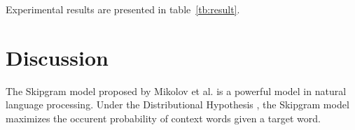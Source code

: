 \documentclass[letterpaper]{article}
\begin{document}
            Experimental results are presented in table~\ref{tb:result}.

            \begin{table}
                \centering
                \label{tb:result}
                \caption{Multilabel classification weighted f1-macro}
            \end{table}

    \section{Discussion}

            The Skipgram model proposed by Mikolov et al. \cite{skipgram} is a powerful model 
            in natural language processing. Under the Distributional Hypothesis \cite{disthyp},
            the Skipgram model maximizes the occurent probability of context words given a target
            word. 
\end{document}
